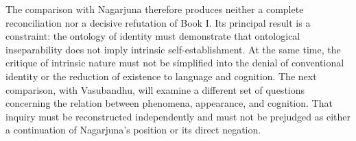\label{para:VS.B01.P01.C08.S18.SS20.P003}
The comparison with Nagarjuna therefore produces neither a complete reconciliation nor a decisive refutation of Book I. Its principal result is a constraint: the ontology of identity must demonstrate that ontological inseparability does not imply intrinsic self-establishment. At the same time, the critique of intrinsic nature must not be simplified into the denial of conventional identity or the reduction of existence to language and cognition. The next comparison, with Vasubandhu, will examine a different set of questions concerning the relation between phenomena, appearance, and cognition. That inquiry must be reconstructed independently and must not be prejudged as either a continuation of Nagarjuna's position or its direct negation.

